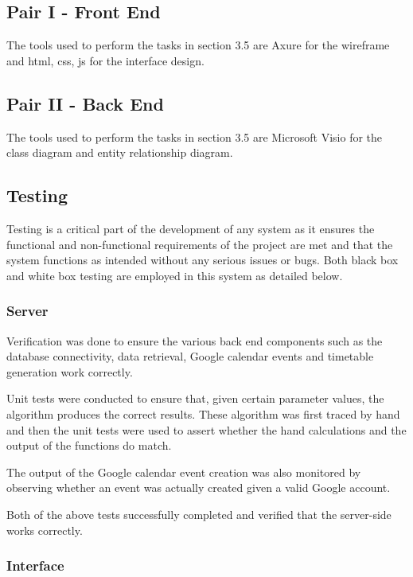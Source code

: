 \subsection{Pair I - Front End}

The tools used to perform the tasks in section 3.5 are Axure for the wireframe and html, css, js for the interface design.

\subsection{Pair II - Back End}

The tools used to perform the tasks in section 3.5 are Microsoft Visio for the class diagram and entity relationship diagram.

\subsection{Testing}

Testing is a critical part of the development of any system as it ensures the functional and non-functional requirements of the project are met and that the system functions as intended without any serious issues or bugs. Both black box and white box testing are employed in this system as detailed below.

\subsubsection{Server}

Verification was done to ensure the various back end components such as the database connectivity, data retrieval, Google calendar events and timetable generation work correctly.

Unit tests were conducted to ensure that, given certain parameter values, the algorithm produces the correct results. These algorithm was first traced by hand and then the unit tests were used to assert whether the hand calculations and the output of the functions do match.

The output of the Google calendar event creation was also monitored by observing whether an event was actually created given a valid Google account.

Both of the above tests successfully completed and verified that the server-side works correctly.

\subsubsection{Interface}


